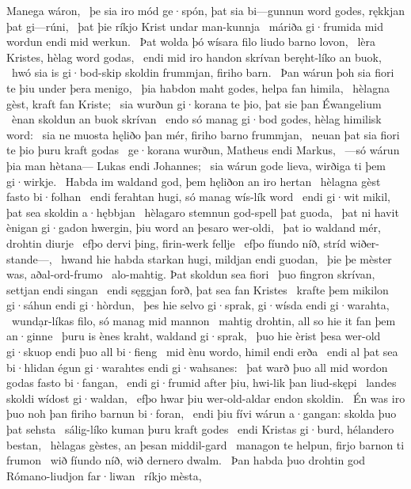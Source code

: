 Manega wáron, \hld\ þe sia iro mód ge·spón,
þat sia bi—gunnun word godes,
rękkjan þat gi—rúni, \hld\ þat þie ríkjo Krist
undar man-kunnja \hld\ máriða gi·frumida
mid wordun endi mid werkun. \hld\ Þat wolda þó wísara filo
liudo barno lovon, \hld\ lèra Kristes,
hèlag word godas, \hld\ endi mid iro handon skrívan
berẹht-líko an buok, \hld\ hwó sia is gi·bod-skip skoldin
frummjan, firiho barn. \hld\ Þan wárun þoh sia fiori te þiu
under þera menigo, \hld\ þia habdon maht godes,
helpa fan himila, \hld\ hèlagna gèst,
kraft fan Kriste; \hld\ sia wurðun gi·korana te þio,
þat sie þan Éwangelium \hld\ ènan skoldun
an buok skrívan \hld\ endo só manag gi·bod godes,
hèlag himilisk word: \hld\ sia ne muosta hęliðo þan mér,
firiho barno frummjan, \hld\ neuan þat sia fiori te þio
þuru kraft godas \hld\ ge·korana wurðun,
Matheus endi Markus, \hld\ —só wárun þia man hètana—
Lukas endi Johannes; \hld\ sia wárun gode lieva,
wirðiga ti þem gi·wirkje. \hld\ Habda im waldand god,
þem hęliðon an iro hertan \hld\ hèlagna gèst
fasto bi·folhan \hld\ endi ferahtan hugi,
só manag wís-lík word \hld\ endi gi·wit mikil,
þat sea skoldin a·hębbjan \hld\ hèlagaro stemnun
god-spell þat guoda, \hld\ þat ni havit ènigan gi·gadon hwergin,
þiu word an þesaro wer-oldi, \hld\ þat io waldand mér,
drohtin diurje \hld\ efþo dervi þing,
firin-werk fellje \hld\ efþo fíundo níð,
stríd wiðer-stande—, \hld\ hwand hie habda starkan hugi,
mildjan endi guodan, \hld\ þie þe mèster was,
aðal-ord-frumo \hld\ alo-mahtig.
Þat skoldun sea fiori \hld\ þuo fingron skrívan,
settjan endi singan \hld\ endi sęggjan forð,
þat sea fan Kristes \hld\ krafte þem mikilon
gi·sáhun endi gi·hòrdun, \hld\ þes hie selvo gi·sprak,
gi·wísda endi gi·warahta, \hld\ wundạr-líkas filo,
só manag mid mannon \hld\ mahtig drohtin,
all so hie it fan þem an·ginne \hld\ þuru is ènes kraht,
waldand gi·sprak, \hld\ þuo hie èrist þesa wer-old gi·skuop
endi þuo all bi·fieng \hld\ mid ènu wordo,
himil endi erða \hld\ endi al þat sea bi·hlidan égun
gi·warahtes endi gi·wahsanes: \hld\ þat warð þuo all mid wordon godas
fasto bi·fangan, \hld\ endi gi·frumid after þiu,
hwi-lik þan liud-skępi \hld\ landes skoldi
wídost gi·waldan, \hld\ efþo hwar þiu wer-old-aldar
endon skoldin. \hld\ Én was iro þuo noh þan
firiho barnun bi·foran, \hld\ endi þiu fívi wárun a·gangan:
skolda þuo þat sehsta \hld\ sálig-líko
kuman þuru kraft godes \hld\  endi Kristas gi·burd,
hélandero bestan, \hld\ hèlagas gèstes,
an þesan middil-gard \hld\ managon te helpun,
firjo barnon ti frumon \hld\ wið fíundo níð,
wið dernero dwalm. \hld\ Þan habda þuo drohtin god
Rómano-liudjon far·liwan \hld\ ríkjo mèsta,
